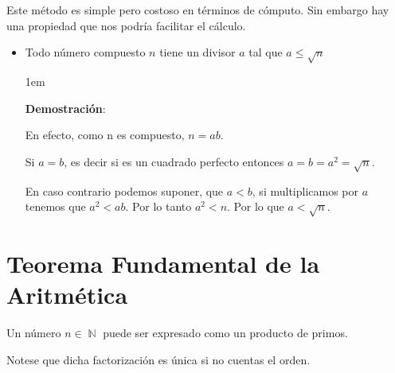 \documentclass[12pt, fleqn]{report}                             %
\newenvironment{SmallIndentation}[1][0.75em]                    %
    {\begin{adjustwidth}{#1}{}\begin{footnotesize}}                 %
    {\end{footnotesize}\end{adjustwidth}}                           %
\DeclareMathOperator \Naturals  {\mathbb{N}}                     %
\begin{document}
            Este método es simple pero costoso en términos de cómputo. Sin
            embargo hay una propiedad que nos podría facilitar el cálculo.

            \begin{itemize}

                \item Todo número compuesto $n$ tiene un divisor $a$ tal que
                    $a \leq \sqrt{n}$

                    \begin{SmallIndentation}[1em]
                        \textbf{Demostración}:

                        En efecto, como n es compuesto, $n = ab$.

                        Si $a = b$, es decir si es un cuadrado perfecto entonces
                        $a = b = a^2 = \sqrt{n}$.

                        En caso contrario podemos suponer, que $a<b$, si multiplicamos
                        por $a$ tenemos que $a^2<ab$. Por lo tanto $a^2 < n$.
                        Por lo que $a < \sqrt{n}$.

                    \end{SmallIndentation}

                \end{itemize}



    \clearpage
    \section{Teorema Fundamental de la Aritmética}

        Un número $n \in \Naturals$ puede ser expresado como
        un producto de primos.

        Notese que dicha factorización es única si no cuentas el 
        orden.
\end{document}
